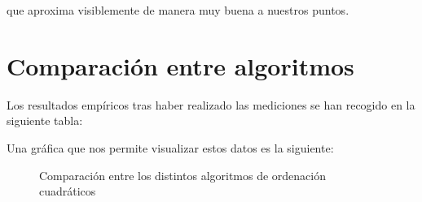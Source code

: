\documentclass{article}
\begin{document}
que aproxima visiblemente de manera muy buena a nuestros puntos.


  
\section{Comparación entre algoritmos}
Los resultados empíricos tras haber realizado las mediciones se han recogido en la siguiente tabla:


Una gráfica que nos permite visualizar estos datos es la siguiente:

\begin{figure}[H]%
    \centering
    \caption{Comparación entre los distintos algoritmos de ordenación cuadráticos}%
    \label{fig:example}%
\end{figure}
\end{document}
